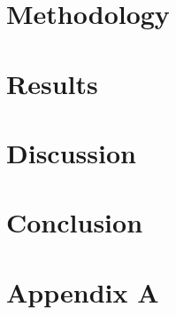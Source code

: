 \documentclass{article}
\begin{document}
\section{Methodology}


\section{Results}


\section{Discussion}

\section{Conclusion}

{
\small



}


\newpage

\appendix

\section{Appendix A}




\end{document}
